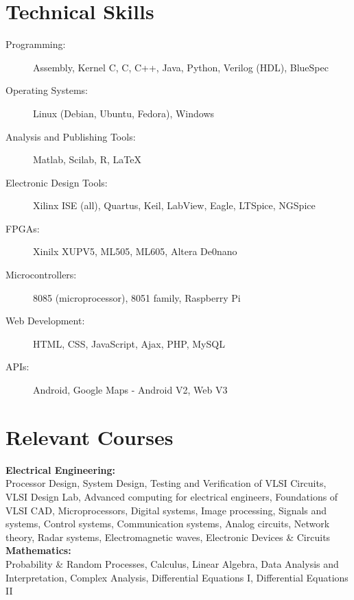 \documentclass[margin,line]{resume}
\begin{document}
\begin{resume}
	

\section{\mysidestyle Technical Skills}
\vspace{0mm}
	\begin{description}
	\item [Programming:] {Assembly, Kernel C, C, C++, Java, Python, Verilog (HDL), BlueSpec}
	\item [Operating Systems:] {Linux (Debian, Ubuntu, Fedora), Windows}
	\item [Analysis and Publishing Tools:] {Matlab, Scilab, R, \LaTeX}
	\item [Electronic Design Tools:] {Xilinx ISE (all), Quartus, Keil, LabView, Eagle, LTSpice, NGSpice}
	\item [FPGAs:] Xinilx XUPV5, ML505, ML605, Altera De0nano
	\item [Microcontrollers:] 8085 (microprocessor), 8051 family, Raspberry Pi
	\item [Web Development:] HTML, CSS, JavaScript, Ajax, PHP, MySQL
	\item [APIs:] Android, Google Maps - Android V2, Web V3
	\end {description}


\section{\mysidestyle Relevant Courses}
\vspace{0mm}
    {\bf Electrical Engineering:} \\
	Processor Design, System Design, Testing and Verification of VLSI Circuits, VLSI Design Lab, Advanced computing for electrical engineers, Foundations of VLSI CAD, Microprocessors, Digital systems, Image processing, Signals and systems, Control systems, Communication systems, Analog circuits, Network theory, Radar systems, Electromagnetic waves, Electronic Devices \& Circuits\\
    {\bf Mathematics:} \\
	Probability \& Random Processes, Calculus, Linear Algebra, Data Analysis and Interpretation, Complex Analysis, Differential Equations I, Differential Equations II
	

\end{resume}
\end{document}
